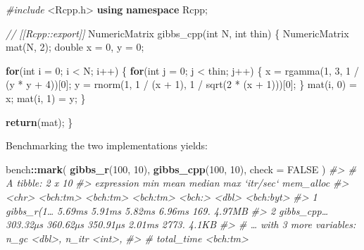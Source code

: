 \documentclass[]{book}
\newenvironment{Shaded}{\begin{snugshade}}{\end{snugshade}}
\newcommand{\CommentTok}[1]{\textcolor[rgb]{0.37,0.37,0.37}{\textit{#1}}}
\newcommand{\ControlFlowTok}[1]{\textcolor[rgb]{0.27,0.27,0.27}{\textbf{#1}}}
\newcommand{\DataTypeTok}[1]{\textcolor[rgb]{0.27,0.27,0.27}{#1}}
\newcommand{\DecValTok}[1]{\textcolor[rgb]{0.06,0.06,0.06}{#1}}
\newcommand{\ImportTok}[1]{#1}
\newcommand{\KeywordTok}[1]{\textcolor[rgb]{0.27,0.27,0.27}{\textbf{#1}}}
\newcommand{\NormalTok}[1]{#1}
\newcommand{\OperatorTok}[1]{\textcolor[rgb]{0.43,0.43,0.43}{\textbf{#1}}}
\newcommand{\OtherTok}[1]{\textcolor[rgb]{0.37,0.37,0.37}{#1}}
\newcommand{\PreprocessorTok}[1]{\textcolor[rgb]{0.37,0.37,0.37}{\textit{#1}}}
\begin{document}
\begin{Shaded}
\begin{Highlighting}[]
\PreprocessorTok{#include }\ImportTok{<Rcpp.h>}
\KeywordTok{using} \KeywordTok{namespace}\NormalTok{ Rcpp;}

\CommentTok{// [[Rcpp::export]]}
\NormalTok{NumericMatrix gibbs_cpp(}\DataTypeTok{int}\NormalTok{ N, }\DataTypeTok{int}\NormalTok{ thin) \{}
\NormalTok{  NumericMatrix mat(N, }\DecValTok{2}\NormalTok{);}
  \DataTypeTok{double}\NormalTok{ x = }\DecValTok{0}\NormalTok{, y = }\DecValTok{0}\NormalTok{;}

  \ControlFlowTok{for}\NormalTok{(}\DataTypeTok{int}\NormalTok{ i = }\DecValTok{0}\NormalTok{; i < N; i++) \{}
    \ControlFlowTok{for}\NormalTok{(}\DataTypeTok{int}\NormalTok{ j = }\DecValTok{0}\NormalTok{; j < thin; j++) \{}
\NormalTok{      x = rgamma(}\DecValTok{1}\NormalTok{, }\DecValTok{3}\NormalTok{, }\DecValTok{1}\NormalTok{ / (y * y + }\DecValTok{4}\NormalTok{))[}\DecValTok{0}\NormalTok{];}
\NormalTok{      y = rnorm(}\DecValTok{1}\NormalTok{, }\DecValTok{1}\NormalTok{ / (x + }\DecValTok{1}\NormalTok{), }\DecValTok{1}\NormalTok{ / sqrt(}\DecValTok{2}\NormalTok{ * (x + }\DecValTok{1}\NormalTok{)))[}\DecValTok{0}\NormalTok{];}
\NormalTok{    \}}
\NormalTok{    mat(i, }\DecValTok{0}\NormalTok{) = x;}
\NormalTok{    mat(i, }\DecValTok{1}\NormalTok{) = y;}
\NormalTok{  \}}

  \ControlFlowTok{return}\NormalTok{(mat);}
\NormalTok{\}}
\end{Highlighting}
\end{Shaded}

Benchmarking the two implementations yields:

\begin{Shaded}
\begin{Highlighting}[]
\NormalTok{bench}\OperatorTok{::}\KeywordTok{mark}\NormalTok{(}
  \KeywordTok{gibbs_r}\NormalTok{(}\DecValTok{100}\NormalTok{, }\DecValTok{10}\NormalTok{),}
  \KeywordTok{gibbs_cpp}\NormalTok{(}\DecValTok{100}\NormalTok{, }\DecValTok{10}\NormalTok{),}
  \DataTypeTok{check =} \OtherTok{FALSE}
\NormalTok{)}
\CommentTok{#> # A tibble: 2 x 10}
\CommentTok{#>   expression      min     mean   median    max `itr/sec` mem_alloc}
\CommentTok{#>   <chr>      <bch:tm> <bch:tm> <bch:tm> <bch:>     <dbl> <bch:byt>}
\CommentTok{#> 1 gibbs_r(1…   5.69ms   5.91ms   5.82ms 6.96ms      169.    4.97MB}
\CommentTok{#> 2 gibbs_cpp… 303.32µs 360.62µs 350.91µs 2.01ms     2773.     4.1KB}
\CommentTok{#> # … with 3 more variables: n_gc <dbl>, n_itr <int>,}
\CommentTok{#> #   total_time <bch:tm>}
\end{Highlighting}
\end{Shaded}
\end{document}
